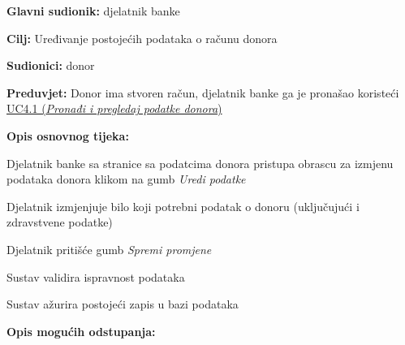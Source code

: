 					\noindent {}
					\begin{packed_item} \label{UC5.1}
	
						\item \textbf{Glavni sudionik: }djelatnik banke
						\item  \textbf{Cilj:} Uređivanje postojećih podataka o računu donora
						\item  \textbf{Sudionici:} donor
						\item  \textbf{Preduvjet:} Donor ima stvoren račun, djelatnik banke ga je pronašao koristeći \hyperref[UC4.1]{UC4.1 (\textit{Pronađi i pregledaj podatke donora})} 
						\item  \textbf{Opis osnovnog tijeka:}
						
						\item[] \begin{packed_enum}
	                        \item Djelatnik banke sa stranice sa podatcima donora pristupa obrascu za izmjenu podataka donora klikom na gumb \textit{Uredi podatke}
	                        \item Djelatnik izmjenjuje bilo koji potrebni podatak o donoru  (uključujući i zdravstvene podatke)
	                        \item Djelatnik pritišće gumb \textit{Spremi promjene}
	                        \item Sustav validira ispravnost podataka
	                        \item Sustav ažurira postojeći zapis u bazi podataka
						\end{packed_enum}
						
						\item  \textbf{Opis mogućih odstupanja:}
						
						\item[] \begin{packed_item}
	

\end{packed_item}
\end{packed_item}
